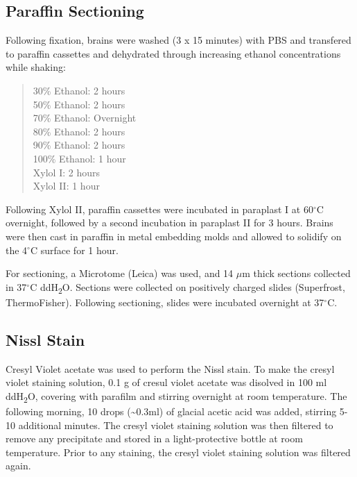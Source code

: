 \documentclass[onehalf,12pt]{beavtex}
\begin{document}
  \subsection{Paraffin Sectioning}\label{paraffin-sectioning}
  
  Following fixation, brains were washed (3 x 15 minutes) with PBS and
  transfered to paraffin cassettes and dehydrated through increasing
  ethanol concentrations while shaking:
  
  \begin{quote}
  30\% Ethanol: 2 hours\\
  50\% Ethanol: 2 hours\\
  70\% Ethanol: Overnight\\
  80\% Ethanol: 2 hours\\
  90\% Ethanol: 2 hours\\
  100\% Ethanol: 1 hour\\
  Xylol I: 2 hours\\
  Xylol II: 1 hour
  \end{quote}
  
  Following Xylol II, paraffin cassettes were incubated in paraplast I at
  60\(^\circ\)C overnight, followed by a second incubation in paraplast II
  for 3 hours. Brains were then cast in paraffin in metal embedding molds
  and allowed to solidify on the 4\(^\circ\)C surface for 1 hour.
  
  For sectioning, a Microtome (Leica) was used, and 14 \(\mu\)m thick
  sections collected in 37\(^\circ\)C ddH\textsubscript{2}O. Sections were
  collected on positively charged slides (Superfrost, ThermoFisher).
  Following sectioning, slides were incubated overnight at 37\(^\circ\)C.
  
  \subsection{Nissl Stain}\label{nissl}
  
  Cresyl Violet acetate was used to perform the Nissl stain. To make the
  cresyl violet staining solution, 0.1 g of cresul violet acetate was
  disolved in 100 ml ddH\textsubscript{2}O, covering with parafilm and
  stirring overnight at room temperature. The following morning, 10 drops
  (\textasciitilde{}0.3ml) of glacial acetic acid was added, stirring 5-10
  additional minutes. The cresyl violet staining solution was then
  filtered to remove any precipitate and stored in a light-protective
  bottle at room temperature. Prior to any staining, the cresyl violet
  staining solution was filtered again.
  
\end{document}

